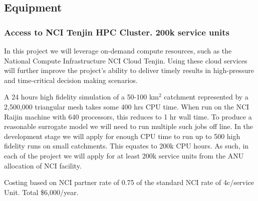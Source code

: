 \documentclass[a4paper,twoside,12pt,compact]{article}
\begin{document}
\subsection*{Equipment}







\subsubsection*{Access to NCI Tenjin HPC Cluster. 200k service units}

In this project we will leverage on-demand compute resources, 
such as the National Compute Infrastructure NCI Cloud Tenjin. 
Using these cloud services will further improve the project's 
ability to deliver timely results in high-pressure and 
time-critical decision making scenarios.

A 24 hours high fidelity simulation of a 50-100 km$^2$ catchment 
represented by a 2,500,000 triangular mesh takes 
some 400 hrs  CPU time. When run on the NCI Raijin machine 
with 640 processors, this reduces to 1 hr wall time.
To produce a reasonable surrogate model we will need to run multiple
such jobs off line.  
In the development stage we will apply for enough CPU time
to run up to 500 high fidelity runs on small catchments. 
This equates to 200k CPU hours.   
As such, in each of the project we will apply for at least
200k service units from the ANU allocation of NCI facility.  

Costing based on NCI partner rate of 0.75  of the standard 
NCI rate of 4c/service Unit. Total \$6,000/year. 
\end{document}
